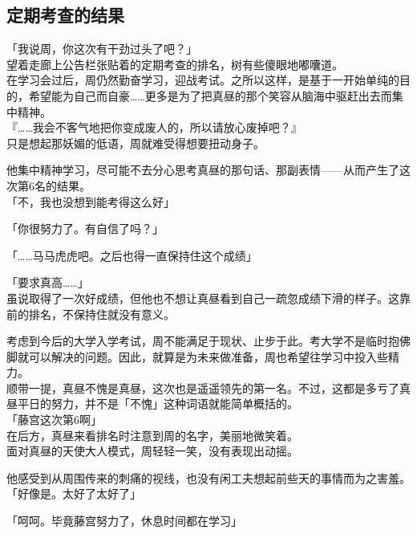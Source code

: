\subsection{定期考查的结果}

「我说周，你这次有干劲过头了吧？」\\

望着走廊上公告栏张贴着的定期考查的排名，树有些傻眼地嘟囔道。\\

在学习会过后，周仍然勤奋学习，迎战考试。之所以这样，是基于一开始单纯的目的，希望能为自己而自豪……更多是为了把真昼的那个笑容从脑海中驱赶出去而集中精神。\\

『……我会不客气地把你变成废人的，所以请放心废掉吧？』\\

只是想起那妖媚的低语，周就难受得想要扭动身子。

他集中精神学习，尽可能不去分心思考真昼的那句话、那副表情——从而产生了这次第6名的结果。\\

「不，我也没想到能考得这么好」

「你很努力了。有自信了吗？」

「……马马虎虎吧。之后也得一直保持住这个成绩」

「要求真高……」\\

虽说取得了一次好成绩，但他也不想让真昼看到自己一疏忽成绩下滑的样子。这靠前的排名，不保持住就没有意义。

考虑到今后的大学入学考试，周不能满足于现状、止步于此。考大学不是临时抱佛脚就可以解决的问题。因此，就算是为未来做准备，周也希望往学习中投入些精力。\\

顺带一提，真昼不愧是真昼，这次也是遥遥领先的第一名。不过，这都是多亏了真昼平日的努力，并不是「不愧」这种词语就能简单概括的。\\

「藤宫这次第6啊」\\

在后方，真昼来看排名时注意到周的名字，美丽地微笑着。\\

面对真昼的天使大人模式，周轻轻一笑，没有表现出动摇。

他感受到从周围传来的刺痛的视线，也没有闲工夫想起前些天的事情而为之害羞。\\

「好像是。太好了太好了」

「呵呵。毕竟藤宫努力了，休息时间都在学习」

